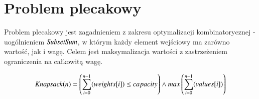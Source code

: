 \section{Problem plecakowy}
Problem plecakowy jest zagadnieniem z zakresu optymalizacji kombinatorycznej - uogólnieniem ${\mathit{SubsetSum}}$, w którym każdy element wejściowy ma zarówno wartość, jak i wagę. Celem jest maksymalizacja wartości z zastrzeżeniem ograniczenia na całkowitą wagę.

\begin{align*}
	{\mathit{Knapsack}}(n) = \left( \sum_{i=0}^{n-1} (weights[i]) \leq capacity \right) \land 
	max \left( \sum_{i=0}^{n-1} (values[i]) \right)
\end{align*}


